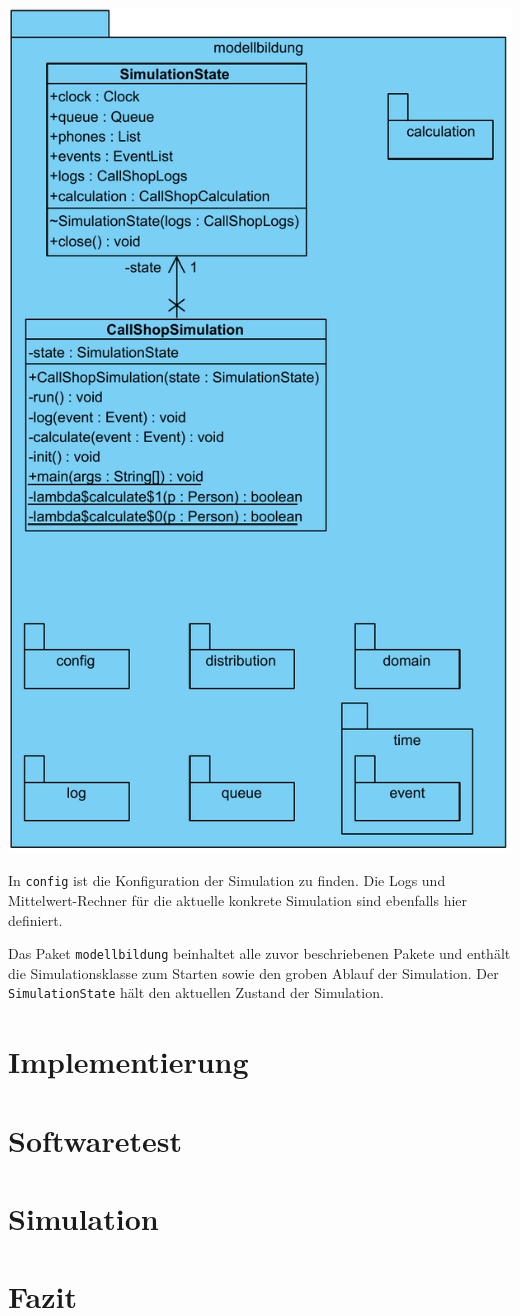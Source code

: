 \includegraphics[scale=0.3]{abbildungen/uml/modellbildung.pdf}

In \texttt{config} ist die Konfiguration der Simulation zu finden. Die Logs und Mittelwert-Rechner für die aktuelle konkrete Simulation sind ebenfalls hier definiert.

Das Paket \texttt{modellbildung} beinhaltet alle zuvor beschriebenen Pakete und enthält die Simulationsklasse zum Starten sowie den groben Ablauf der Simulation. Der \texttt{SimulationState} hält den aktuellen Zustand der Simulation.

\section{Implementierung}

\section{Softwaretest}

\section{Simulation}

\section{Fazit}


